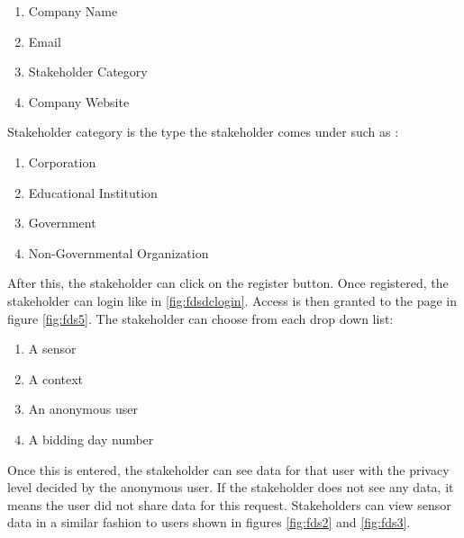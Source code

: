 \begin{enumerate}
    \item Company Name
    \item Email
    \item Stakeholder Category
    \item Company Website
\end{enumerate}

Stakeholder category is the type the stakeholder comes under such as :

\begin{enumerate}
    \item Corporation
    \item Educational Institution
    \item Government
    \item Non-Governmental Organization
\end{enumerate}


After this, the stakeholder can click on the register button. Once registered, the stakeholder can login like in \ref{fig:fdsdclogin}. Access is then granted to the page in figure \ref{fig:fds5}. The stakeholder can choose from each drop down list:
\begin{enumerate}
    \item A sensor
    \item A context
    \item An anonymous user
    \item A bidding day number
\end{enumerate}

Once this is entered, the stakeholder can see data for that user with the privacy level decided by the anonymous user. If the stakeholder does not see any data, it means the user did not share data for this request. Stakeholders can view sensor data in a similar fashion to users shown in figures \ref{fig:fds2} and \ref{fig:fds3}.




